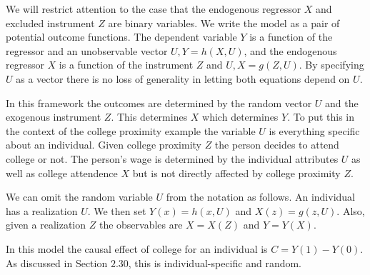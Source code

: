 \documentclass[10pt]{article}
\begin{document}
We will restrict attention to the case that the endogenous regressor $X$ and excluded instrument $Z$ are binary variables. We write the model as a pair of potential outcome functions. The dependent variable $Y$ is a function of the regressor and an unobservable vector $U, Y=h(X, U)$, and the endogenous regressor $X$ is a function of the instrument $Z$ and $U, X=g(Z, U)$. By specifying $U$ as a vector there is no loss of generality in letting both equations depend on $U$.

In this framework the outcomes are determined by the random vector $U$ and the exogenous instrument $Z$. This determines $X$ which determines $Y$. To put this in the context of the college proximity example the variable $U$ is everything specific about an individual. Given college proximity $Z$ the person decides to attend college or not. The person's wage is determined by the individual attributes $U$ as well as college attendence $X$ but is not directly affected by college proximity $Z$.

We can omit the random variable $U$ from the notation as follows. An individual has a realization $U$. We then set $Y(x)=h(x, U)$ and $X(z)=g(z, U)$. Also, given a realization $Z$ the observables are $X=X(Z)$ and $Y=Y(X)$.

In this model the causal effect of college for an individual is $C=Y(1)-Y(0)$. As discussed in Section $2.30$, this is individual-specific and random.
\end{document}
